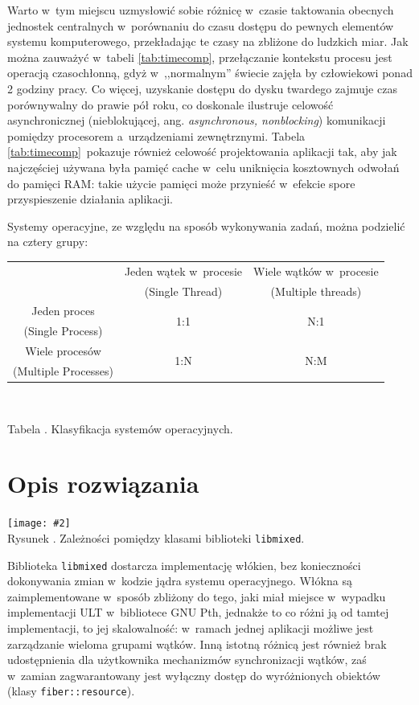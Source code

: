 \documentclass[12pt]{mwart}
\newcommand{\code}{\texttt}
\newcommand{\dcolon}{::}
\newcounter{tabmain}
\newcommand{\mytabcaption}[1]{ \begin{center}Tabela \arabic{tabmain}. #1.\end{center} \addtocounter{tabmain}{1} }
\newcounter{figmain}
\newcommand{\myownfigure}[4]{ \newcounter{#1} \setcounter{#1}{\value{figmain}} \addtocounter{figmain}{1} \begin{center} \label{fig:#1} \centering \texttt{[image: \#2]}\\ \nopagebreak[4] Rysunek \arabic{#1}. #3. \end{center}}
\begin{document}
	Warto w~tym miejscu uzmysłowić sobie różnicę w~czasie taktowania obecnych jednostek centralnych w~porównaniu do czasu dostępu do pewnych
	elementów systemu komputerowego, przekładając te czasy na zbliżone do ludzkich miar. Jak można zauważyć w~tabeli \ref{tab:timecomp},
	przełączanie kontekstu procesu jest operacją czasochłonną, gdyż w~,,normalnym'' świecie zajęła by człowiekowi ponad 2 godziny pracy.
	Co więcej, uzyskanie dostępu do dysku twardego zajmuje czas porównywalny do prawie pół roku, co doskonale ilustruje celowość asynchronicznej
	(nieblokującej, ang. \emph{asynchronous, non\dywiz{}blocking}) komunikacji pomiędzy procesorem a~urządzeniami zewnętrznymi.
	Tabela \ref{tab:timecomp}~pokazuje również celowość projektowania aplikacji tak, aby jak najczęściej używana była pamięć cache w~celu uniknięcia
	kosztownych odwołań do pamięci RAM: takie użycie pamięci może przynieść w~efekcie spore przyspieszenie działania aplikacji.
\par
%
\indent
	Systemy operacyjne, ze względu na sposób wykonywania zadań, można podzielić na cztery grupy:
	\begin{center}
	\centering
	\begin{tabular}{|c|c|c|} \hline
													 & Jeden wątek w~procesie   	 & Wiele wątków w~procesie \\
													 & (Single Thread)          	 & (Multiple threads)      \\\hline
			Jeden proces         & \multirow{2}{*}{1:1} 	     & \multirow{2}{*}{N:1}	 \\
			(Single Process)     &  										   		 &  									     \\\hline
			Wiele procesów       & \multirow{2}{*}{1:N}       & \multirow{2}{*}{N:M}   \\
			(Multiple Processes) &                             &                         \\\hline
	\end{tabular}\\
	\mytabcaption{Klasyfikacja systemów operacyjnych}
	\end{center}
\par
%
\newpage
\section{Opis rozwiązania}
\label{sec:solution}
\begin{center}
  \myownfigure{libmixedoverview}{libmixedOverview.png}{Zależności pomiędzy klasami biblioteki \code{libmixed}}{.7}
\end{center}
\indent
	Biblioteka \code{libmixed} dostarcza implementację włókien, bez konieczności dokonywania zmian w~kodzie jądra systemu operacyjnego.
	Włókna są zaimplementowane w~sposób zbliżony do tego, jaki miał miejsce w~wypadku implementacji ULT w~bibliotece GNU Pth, jednakże to
	co różni ją od tamtej implementacji, to jej skalowalność: w~ramach jednej aplikacji możliwe jest zarządzanie wieloma grupami wątków.
	Inną istotną różnicą jest również brak udostępnienia dla użytkownika mechanizmów synchronizacji wątków, zaś w~zamian zagwarantowany
	jest wyłączny dostęp do wyróżnionych obiektów (klasy \code{fiber\dcolon resource}).
\par
%
\end{document}
